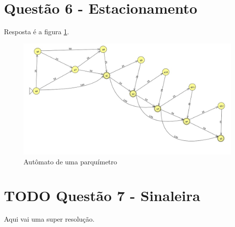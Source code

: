 \documentclass[11pt]{article}
\begin{document}
\section{Questão 6 - Estacionamento}
\label{sec:org57c5066}
Resposta é a figura \ref{fig:orgd5f5ed3}.
\begin{figure}[htbp]
\centering
\includegraphics[width=.9\linewidth]{./q6/estacionamento.jpg}
\caption{\label{fig:orgd5f5ed3}
Autômato de uma parquímetro}
\end{figure}
\section{{\bfseries\sffamily TODO} Questão 7 - Sinaleira}
\label{sec:orgc539776}
Aqui vai uma super resolução.
\end{document}
